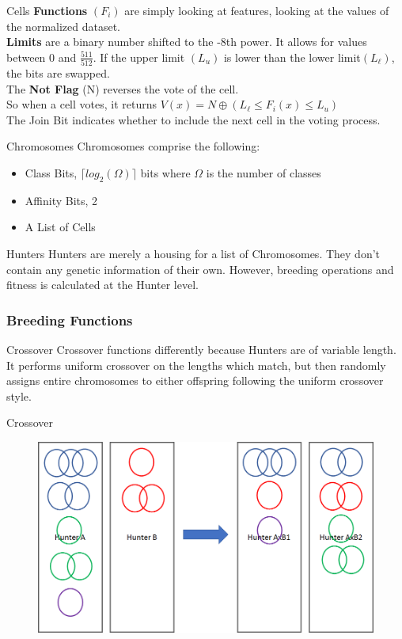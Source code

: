\documentclass{beamer}
\begin{document}
\begin{frame}{Cells}
	\textbf{Functions} \((F_i)\) are simply looking at features, looking at the values of the normalized dataset.  \\
	\textbf{Limits} are a binary number shifted to the -8th power.  It allows for values between 0 and \(\frac{511}{512}\).  If the upper limit \((L_u)\) is lower than the lower limit\((L_\ell)\), the bits are swapped.\\
	The \textbf{Not Flag} (N) reverses the vote of the cell. \\
	So when a cell votes, it returns \(V(x)= N\oplus  (L_\ell \leq F_i(x) \leq L_u)\)\\ 
	The Join Bit indicates whether to include the next cell in the voting process. 
\end{frame}
\begin{frame}{Chromosomes}
	Chromosomes comprise the following:
\begin{itemize}
	\item Class Bits, \(\lceil log_2(\Omega)\rceil\) bits where \(\Omega\) is the number of classes
	\item Affinity Bits, 2
	\item A List of Cells
\end{itemize}
\end{frame}


\begin{frame}{Hunters}
	Hunters are merely a housing for a list of Chromosomes.  They don't contain any genetic information of their own.  However, breeding operations and fitness is calculated at the Hunter level.
\end{frame}
\subsubsection{Breeding Functions}
\begin{frame}{Crossover}
	Crossover functions differently because Hunters are of variable length.  It performs uniform crossover on the lengths which match, but then randomly assigns entire chromosomes to either offspring following the uniform crossover style.
	 
\end{frame}

\begin{frame}{Crossover}

\begin{figure}
	\centering
	\includegraphics[width=0.7\linewidth]{figures/png/HunterCrossover}

	\label{fig:huntercrossover}
\end{figure}
\end{frame}
\end{document}
